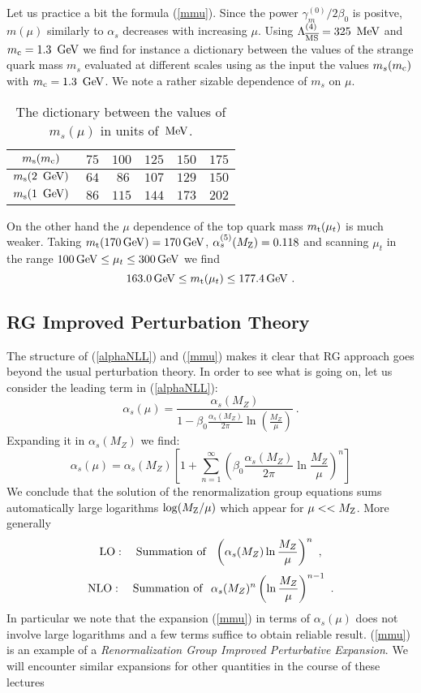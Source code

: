 \documentclass[12pt,rotate]{article}
\def\as{\alpha_s}
\newcommand{\mt}{m_{\rm t}}
\newcommand{\mc}{m_{\rm c}}
\newcommand{\ms}{m_{\rm s}}
\newcommand{\mz}{M_{\rm Z}}
\newcommand{\gev}{\, {\rm GeV}}
\newcommand{\mev}{\, {\rm MeV}}
\newcommand{\Lms}{\Lambda_{\overline{\rm MS}}}
\newcommand{\be}{\begin{equation}}
\newcommand{\ee}{\end{equation}}
\begin{document}
\begin{itemize}
\begin{itemize}
Let us practice a bit the formula (\ref{mmu}). Since the power
$\gamma^{(0)}_m/2\beta_0$ is positve, $m(\mu)$ similarly to $\alpha_s$
decreases with increasing $\mu$. 
Using  $\Lms^{(4)}=325~\mev$ and
$\mc=1.3~\gev$ we find for instance a dictionary between the values
of the strange quark mass $m_s$ evaluated at different scales
using as the input the values $m_s(\mc)$ with $\mc=1.3~\gev$. 
We note a rather
sizable dependence of $m_s$ on $\mu$.
\begin{table}[thb]
\caption[]{The dictionary between the values of $m_s(\mu)$ 
in units of $\mev$.
\label{tab:ms}}
\begin{center}
\begin{tabular}{|c|c|c|c|c|c|}\hline
  $\ms(\mc)$& $ ~75$& $100$& $125$ & $150$ &  $175$ \\ \hline
 $\ms(2~\gev)$& $ ~64$& $~86$& $107$ & $129$ &  $150$ \\ \hline
 $\ms(1~\gev)$& $ ~86$& $115$& $144$ & $173$ &  $202$ \\ \hline
 \end{tabular}
\end{center}
\end{table}

On the other hand the $\mu$ dependence of the top quark mass 
$\mt(\mu_t)$ is much weaker. Taking
$\mt(170\gev) = 170\gev$,  $\alpha_s^{(5)}(\mz)=0.118$ and
scanning $\mu_t$ in the range  $100\gev\le \mu_t \le 300\gev$
we find 
\be
163.0\gev\le \mt(\mu_t)\le 177.4\gev~.
\ee

\subsection{RG Improved Perturbation Theory}
The structure of (\ref{alphaNLL}) and (\ref{mmu})
makes it clear that RG approach goes
 beyond the usual perturbation theory. In order to see what is going on,
let us consider the leading term in (\ref{alphaNLL}):
\be \label{alphaLO}
\as(\mu) = \frac{\as(M_Z)}{1 - \beta_0 \frac{\as(M_Z)}{2 \pi} 
\ln \left( \frac{M_Z}{\mu} \right)}~.
\ee
Expanding it  in $\as(M_Z)$ we find:
\be \label{EXPLO}
\as(\mu) = \as(M_Z)\left[1 +\sum_{n=1}^\infty
\left( \beta_0 \frac{\as(M_Z)}{2 \pi} 
\ln \frac{M_Z}{\mu}\right)^n\right]  
\ee
We conclude that the
solution of the renormalization group equations sums automatically 
large logarithms $ \log (\mz/\mu) $ which appear for $ \mu<<\mz $.
More generally
\be
 {\rm LO}:\quad {\rm Summation~of}~~
 \left(\as(M_Z)\ln \frac{M_Z}{\mu}\right)^n~,
\ee
\be
{\rm  NLO}:\quad {\rm Summation~ of}~~
 \as(M_Z)^n\left(\ln \frac{M_Z}{\mu}\right)^{n-1}~.
\ee
In particular we note that
the expansion (\ref{mmu}) in terms of 
$\as(\mu)$ does not
involve large logarithms and a few terms suffice to obtain reliable
result. 
(\ref{mmu}) is an example of a
{\it Renormalization Group Improved Perturbative Expansion}.
We will encounter similar expansions for other quantities in the
course of these lectures

\end{itemize}
\end{itemize}
\end{document}
